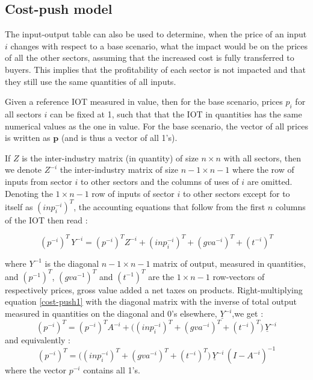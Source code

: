 \documentclass[12pt,english]{article}
\begin{document}
\subsection{Cost-push model}

The input-output table can also be used to determine, when the price of an input $i$ changes with respect to a base scenario, what the impact would be on the prices of all the other sectors, assuming that the increased cost is fully transferred to buyers. This implies that the profitability of each sector is not impacted and that they still use the same quantities of all inputs. 

Given a reference IOT measured in value, then for the base scenario, prices $p_i$ for all sectors $i$ can be fixed at 1, such that that the IOT in quantities has the same numerical values as the one in value. For the base scenario, the vector of all prices is written as $\boldsymbol{p}$ (and is thus a vector of all 1's).

If $Z$ is the inter-industry matrix (in quantity) of size $n\times n$ with all sectors, then we denote $Z^{-i}$ the inter-industry matrix of size $n-1 \times n-1$ where the row of inputs from sector $i$ to other sectors and the columns of uses of $i$ are omitted. Denoting the $1 \times n-1$ row of inputs of sector $i$ to other sectors except for to itself as $(inp^{-i}_i)^T$, the accounting equations that follow from the first $n$ columns of the IOT then read :

\begin{equation}
(p^{-i})^T \, Y^{-i} = (p^{-i})^T Z^{-i} + (inp^{-i}_i)^T + (gva^{-i})^T + (t^{-i})^T \label{cost-push1}
\end{equation}

where $Y^{-1}$ is the diagonal $n-1 \times n-1$ matrix of output, measured in quantities, and $(p^{-1})^T$, $(gva^{-1})^T$  and $(t^{-1})^T$ are the $1 \times n-1$ row-vectors of respectively prices, gross value added a net taxes on products. Right-multiplying equation \ref{cost-push1} with the diagonal matrix with the inverse of total output measured in quantities on the diagonal and 0's elsewhere, $\underline{Y}^{-i}$,we get :
\begin{equation}
(p^{-i})^T  = (p^{-i})^T A^{-i} + \Big((inp^{-i}_i)^T + (gva^{-i})^T + (t^{-i})^T \Big)\, \underline{Y}^{-i} \label{cost-push2}
\end{equation}
and equivalently :
\begin{equation}
(p^{-i})^T  =  \Big((inp^{-i}_i)^T + (gva^{-i})^T + (t^{-i})^T \Big)\, \underline{Y}^{-i} \, (I - A^{-i})^{-1} \label{cost-push3}
\end{equation}
where the vector $p^{-i}$ contains all 1's.
\end{document}
